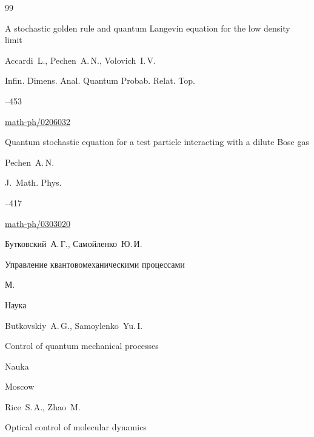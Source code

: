 \begin{thebibliography}{99}

\paper A stochastic golden rule and quantum Langevin equation for the low density limit

\by Accardi~L., Pechen~A.\,N., Volovich~I.\,V.

\jour Infin. Dimens. Anal. Quantum Probab. Relat. Top.




--453

\arxiv 	\href{http://arxiv.org/abs/math-ph/0206032}{math-ph/0206032}








\paper Quantum stochastic equation for a test particle interacting with a dilute Bose gas

\by Pechen~A.\,N.

\jour J.~Math. Phys.




--417

\arxiv 	\href{http://arxiv.org/abs/math-ph/0303020}{math-ph/0303020}






\by Бутковский~А.\,Г., Самойленко~Ю.\,И.

\book Управление квантовомеханическими процессами

\publaddr М.

\publ Наука



\misctransl 

\by Butkovskiy~A.\,G., Samoylenko~Yu.\,I.

\book Control of quantum mecha\-nical processes

\publ Nauka

\publaddr Moscow






\by Rice~S.\,A., Zhao~M.

\book Optical control of molecular dynamics


\end{thebibliography}
